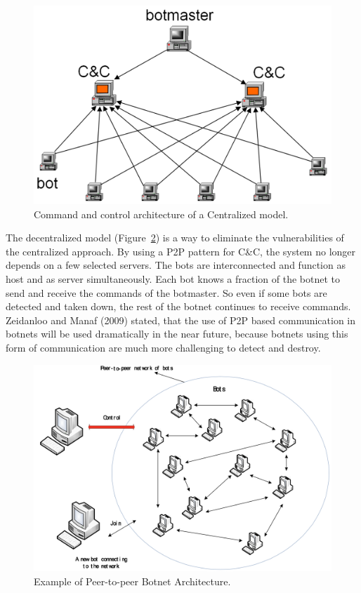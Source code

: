 \begin{figure}[ht]
\begin{center} \includegraphics[scale=0.3]{Talk11/CC-centralized} \end{center}
\caption{Command and control architecture of a Centralized model.\cite{Zeidanloo09}}
\label{fig:centralized}
\end{figure}

The decentralized model (Figure~\ref{fig:decentralized}) is a way to eliminate the vulnerabilities of the centralized approach.
By using a P2P pattern for C\&C, the system no longer depends on a few selected servers.
The bots are interconnected and function as host and as server simultaneously.
Each bot knows a fraction of the botnet to send and receive the commands of the botmaster.
So even if some bots are detected and taken down, the rest of the botnet continues to receive commands.
Zeidanloo and Manaf (2009) stated, that the use of P2P based communication in botnets will be used dramatically in the near future, because botnets using this form of communication are much more challenging to detect and destroy.\cite{Zeidanloo09}

\begin{figure}[ht]
\begin{center} \includegraphics[scale=0.3]{Talk11/CC-P2P} \end{center}
\caption{Example of Peer-to-peer Botnet Architecture.\cite{Zeidanloo09}}
\label{fig:decentralized}
\end{figure}

